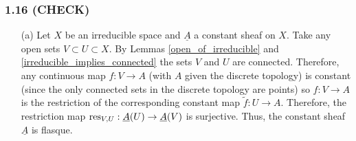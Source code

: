 \documentclass[12pt]{article}
\begin{document}
\subsubsection{1.16 (CHECK)}

\begin{enumerate}
\item[(a)] Let $X$ be an irreducible space and $\underline{A}$ a constant sheaf on $X$. Take any open sets $V \subset U \subset X$. By Lemmas \ref{open_of_irreducible} and \ref{irreducible_implies_connected} the sets $V$ and $U$ are connected. Therefore, any continuous map $f : V \to A$ (with $A$ given the discrete topology) is constant (since the only connected sets in the discrete topology are points) so $f : V \to A$ is the restriction of the corresponding constant map $\tilde{f} : U \to A$. Therefore, the restriction map $\mathrm{res}_{V,U} : \underline{A}(U) \to \underline{A}(V)$ is surjective. Thus, the constant sheaf $\underline{A}$ is flasque.  


\end{enumerate}
\end{document}
